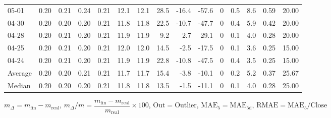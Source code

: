 \begin{threeparttable}
{\begin{tabular}{lrrrrrrrrrrrrrr}
  05-01 &          0.20 &          0.21 &          0.24 &        0.21 &                12.1 &               12.1 &                28.5 &      -16.4 &        -57.6 &              0 &                 0.5 &              8.6 &            0.59 &                  20.00 \\
  04-30 &          0.20 &          0.20 &          0.20 &        0.21 &                11.8 &               11.8 &                22.5 &      -10.7 &        -47.7 &              0 &                 0.4 &              5.9 &            0.42 &                  20.00 \\
  04-28 &          0.20 &          0.21 &          0.20 &        0.21 &                11.9 &               11.9 &                 9.2 &        2.7 &         29.1 &              0 &                 0.1 &              4.0 &            0.28 &                  20.00 \\
  04-25 &          0.20 &          0.21 &          0.20 &        0.21 &                12.0 &               12.0 &                14.5 &       -2.5 &        -17.5 &              0 &                 0.1 &              3.6 &            0.25 &                  15.00 \\
  04-24 &          0.20 &          0.21 &          0.20 &        0.21 &                11.9 &               11.9 &                22.8 &      -10.8 &        -47.5 &              0 &                 0.4 &              3.5 &            0.25 &                  15.00 \\
Average &          0.20 &          0.20 &          0.21 &        0.21 &                11.7 &               11.7 &                15.4 &       -3.8 &        -10.1 &              0 &                 0.2 &              5.2 &            0.37 &                  25.67 \\
 Median &          0.20 &          0.20 &          0.20 &        0.21 &                11.8 &               11.8 &                13.5 &       -1.5 &        -11.1 &              0 &                 0.1 &              4.0 &            0.28 &                  25.00 \\
\bottomrule
\end{tabular}
}
\begin{tablenotes}\footnotesize
\item $m_\Delta=m_{\text{fin}}-m_{\text{real}}$,
$m_\Delta/m=\dfrac{m_{\text{fin}}-m_{\text{real}}}{m_{\text{real}}}\times100$,
$\mathrm{Out}=\text{Outlier}$,
$\mathrm{MAE}_5=\mathrm{MAE}_{5\text{d}}$,
$\mathrm{RMAE}=\mathrm{MAE}_5/\text{Close}$
\end{tablenotes}
\end{threeparttable}
\endgroup

